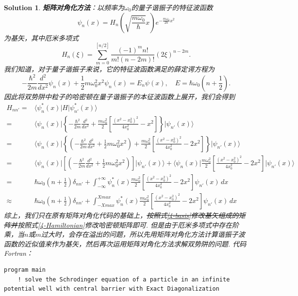 \documentclass[UTF8,10pt,a4paper]{article}
\theoremstyle{Problem}
\theoremstyle{Solution}
\newtheorem*{sol}{Solution}
\begin{document}
\begin{sol}
    \textbf{矩阵对角化方法}：以频率为$\omega_0$的量子谐振子的特征波函数
    \begin{equation}
        \label{4-basis}
        \psi_n(x)=H_n\left(\sqrt{\frac{m\omega_0}{\hbar}}x\right)e^{-\frac{m\omega_0}{2\hbar}x^2}
    \end{equation}
    为基矢，其中厄米多项式
    \begin{equation}
        H_n(\xi)=\sum_{m=0}^{[n/2]}\frac{(-1)^mn!}{m!(n-2m)!}(2\xi)^{n-2m}.
    \end{equation}
    我们知道，对于量子谐振子来说，它的特征波函数满足的薛定谔方程为
    \begin{equation}
        -\frac{\hbar^2}{2m}\frac{d^2}{dx^2}\psi_n(x)+\frac{1}{2}m\omega_0^2x^2\psi_n(x)=E_n\psi(x),\quad E=\hbar\omega_0\left(n+\frac{1}{2}\right).
    \end{equation}
    因此将双势阱中粒子的哈密顿在量子谐振子的本征波函数上展开，我们会得到
    \begin{align}
        \label{4-Hamiltonian}
        \nonumber H_{nn'}=&\langle\psi_n^*(x)\rvert H\lvert\psi_{n'}^*(x)\rangle\\
        \nonumber=&\langle\psi_n(x)\rvert\left\{-\frac{\hbar^2}{2m}\frac{d^2}{dx^2}+\frac{m\omega_0^2}{2}\left[\frac{(x^2-x_0^2)^2}{4x_0^2}-x^2\right]\right\}\lvert\psi_{n'}(x)\rangle\\
        \nonumber=&\langle\psi_n(x)\rvert\left\{\left(-\frac{\hbar^2}{2m}\frac{d^2}{dx^2}+\frac{1}{2}m\omega_0^2x^2\right)+\frac{m\omega_0^2}{2}\left[\frac{(x^2-x_0^2)^2}{4x_0^2}-2x^2\right]\right\}\lvert\psi_{n'}(x)\rangle\\
        \nonumber=&\langle\psi_n(x)\rvert\left[\left(-\frac{\hbar^2}{2m}\frac{d^2}{dx^2}+\frac{1}{2}m\omega_0^2x^2\right)\right]\lvert\psi_{n'}(x)\rangle+\langle\psi_n(x)\rvert\frac{m\omega_0^2}{2}\left[\frac{(x^2-x_0^2)^2}{4x_0^2}-2x^2\right]\lvert\psi_{n'}(x)\rangle\\
        \nonumber=&\hbar\omega_0\left(n+\frac{1}{2}\right)\delta_{nn'}+\int_{-\infty}^{+\infty}\psi_n^*(x)\frac{m\omega_0^2}{2}\left[\frac{(x^2-x_0^2)^2}{4x_0^2}-2x^2\right]\psi_{n'}(x)\,dx\\
        \approx&\hbar\omega_0\left(n+\frac{1}{2}\right)\delta_{nn'}+\int_{-Xmax}^{Xmax}\psi_n^*(x)\frac{m\omega_0^2}{2}\left[\frac{(x^2-x_0^2)^2}{4x_0^2}-2x^2\right]\psi_{n'}(x)\,dx
    \end{align}
    综上，我们只在原有矩阵对角化代码的基础上，\sout{按照式\eqref{4-basis}修改基矢组成的矩阵并}按照式\eqref{4-Hamiltonian}修改哈密顿矩阵即可. 但是由于厄米多项式中存在阶乘，当$n$或$m$过大时，会存在溢出的问题，所以先用矩阵对角化方法计算谐振子波函数的近似值来作为基矢，然后再次运用矩阵对角化方法求解双势阱的问题. 代码Fortran：
    \begin{lstlisting}
program main
    ! solve the Schrodinger equation of a particle in an infinite potential well with central barrier with Exact Diagonalization


\end{lstlisting}
\end{sol}
\end{document}
